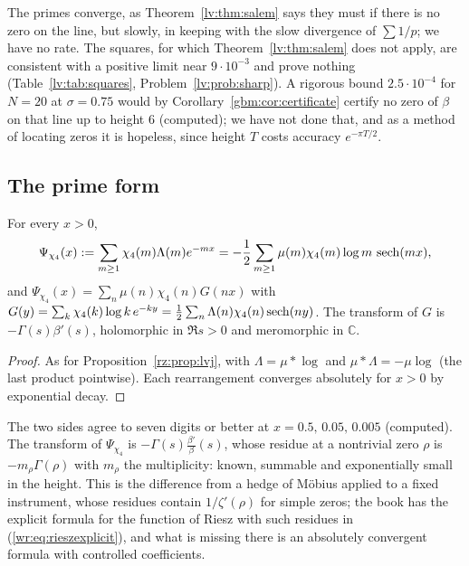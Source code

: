 The primes converge, as Theorem~\ref{lv:thm:salem} says they must if there is no zero on the line, but slowly, in keeping with the slow divergence of $\sum1/p$; we have no rate. The squares, for which Theorem~\ref{lv:thm:salem} does not apply, are consistent with a positive limit near $9\cdot10^{-3}$ and prove nothing (Table~\ref{lv:tab:squares}, Problem~\ref{lv:prob:sharp}). A rigorous bound $2.5\cdot10^{-4}$ for $N=20$ at $\sigma=0.75$ would by Corollary~\ref{gbm:cor:certificate} certify no zero of $\beta$ on that line up to height $6$ (computed); we have not done that, and as a method of locating zeros it is hopeless, since height $T$ costs accuracy $e^{-\pi T/2}$.

\subsection{The prime form}\label{gbm:sec:primeform}

\begin{proposition}\label{gbm:prop:primeform}
For every $x>0$,
\[
\Psi_{\chi_4}(x):=\sum_{m\ge1}\chi_4(m)\Lambda(m)e^{-mx}=-\frac12\sum_{m\ge1}\mu(m)\chi_4(m)\log m\,\operatorname{sech}(mx),
\]
and $\Psi_{\chi_4}(x)=\sum_n\mu(n)\chi_4(n)G(nx)$ with $G(y)=\sum_k\chi_4(k)\log k\,e^{-ky}=\frac12\sum_n\Lambda(n)\chi_4(n)\operatorname{sech}(ny)$. The transform of $G$ is $-\Gamma(s)\beta'(s)$, holomorphic in $\Re s>0$ and meromorphic in $\mathbb C$.
\end{proposition}

\begin{proof}
As for Proposition~\ref{rz:prop:lvj}, with $\Lambda=\mu*\log$ and $\mu*\Lambda=-\mu\log$ (the last product pointwise). Each rearrangement converges absolutely for $x>0$ by exponential decay.
\end{proof}

The two sides agree to seven digits or better at $x=0.5,\,0.05,\,0.005$ (computed). The transform of $\Psi_{\chi_4}$ is $-\Gamma(s)\frac{\beta'}{\beta}(s)$, whose residue at a nontrivial zero $\rho$ is $-m_\rho\Gamma(\rho)$ with $m_\rho$ the multiplicity: known, summable and exponentially small in the height. This is the difference from a hedge of M\"obius applied to a fixed instrument, whose residues contain $1/\zeta'(\rho)$ for simple zeros; the book has the explicit formula for the function of Riesz with such residues in (\ref{wr:eq:rieszexplicit}), and what is missing there is an absolutely convergent formula with controlled coefficients.

